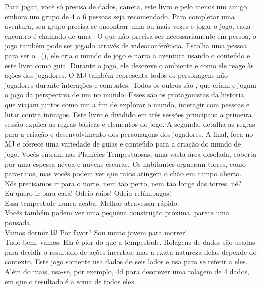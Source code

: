 Para jogar, você só precisa de dados, caneta, este livro e pelo menos um amigo, embora um grupo de 4 a 6 pessoas seja recomendado. Para completar uma aventura, seu grupo precisa se encontrar uma ou mais vezes e jogar o jogo, cada encontro é chamado de uma .
O que não precisa ser necessariamente em pessoa, o jogo também pode ser jogado através de videoconferência.
%
\ofpar
%
Escolha uma pessoa para ser o ~(), ele cria o mundo de jogo e narra a aventura usando o conteúdo e este livro como guia. 
Durante o jogo, ele descreve o ambiente e como ele reage às ações dos jogadores.
O MJ também representa todos os personagens não-jogadores durante interações e combates.
Todos os outros são , que criam e jogam o jogo da perspectiva de um  no mundo. 
Esses são os protagonistas da historia, que viajam juntos como um   a fim de explorar o mundo, interagir com pessoas e lutar contra inimigos. 
Este livro é dividido em três sessões principais: a primeira sessão explica as regras básicas e elementos do jogo. 
A segunda, detalha as regras para a criação e desenvolvimento dos personagens dos jogadores. 
A final, foca no MJ e oferece uma variedade de guias e conteúdo para a criação do mundo de jogo.
%
\vfill
%
{
	\newcommand{\nl}{\vspace{0.2cm}\\}
	 Vocês entram nas Planícies Tempestuosas, uma vasta área desolada, coberta por uma espessa névoa e nuvens escuras. Os habitantes ergueram torres, como para-raios, mas vocês podem ver que raios atingem o chão em campo aberto.\nl
	 Nós precisamos ir para o norte, nem tão perto, nem tão longe das torres, né?\nl
	 Eu quero ir para casa! Odeio raios! Odeio relâmpagos!\nl
	 Essa tempestade nunca acaba. Melhor atravessar rápido.\nl
	 Vocês também podem ver uma pequena construção próxima, parece uma pousada.\nl
	 Vamos dormir lá! Por favor? Sou muito jovem para morrer!\nl
	 Tudo bem, vamos. Ela é pior do que a tempestade.
}
%
\vfill
%
	Rolagens de dados são usadas para decidir o resultado de ações incertas, mas a exata natureza delas depende do contexto. 
	Este jogo somente usa dados de seis lados e usa  para se referir a eles. 
	Além do mais, usa-se, por exemplo, 4d para descrever uma rolagem de 4 dados, em que o resultado é a soma de todos eles.
